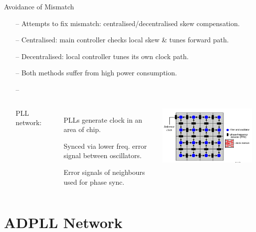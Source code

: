 \documentclass{beamer}
\begin{document}
\begin{frame}{Avoidance of Mismatch}

    \begin{itemize}
        \item[--]
            Attempts to fix mismatch: centralised/decentralised skew compensation.
        \item[--]
            Centralised: main controller checks local skew \& tunes forward path.
        \item[--]
            Decentralised: local controller tunes its own clock path.
        \item[--]
            Both methods suffer from high power consumption.
        \item[--]
        \begin{columns}        	
        	\flushleft
            PLL network:
             \begin{itemize}
	            \item[]
	           	 	PLLs generate clock in an area of chip.
	            \item[]
	            	Synced via lower freq. error signal between oscillators.
	            \item[]
	            	Error signals of neighbours used for phase sync.
            \end{itemize}
        	\includegraphics[scale=0.55]{network_ccic2013}
        \end{columns}
     \end{itemize}   
 
\end{frame}
\section*{ADPLL Network}
\end{document}
